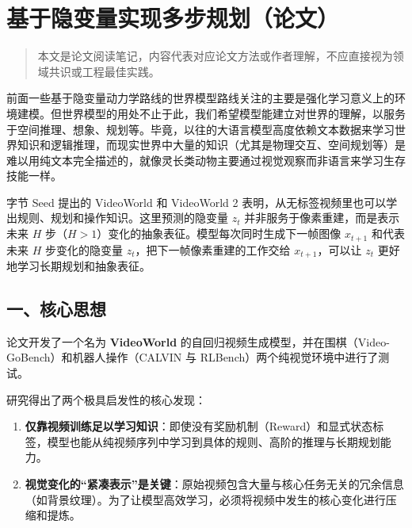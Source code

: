 \clearpage

\hypertarget{ux57faux4e8eux9690ux53d8ux91cfux5b9eux73b0ux591aux6b65ux89c4ux5212ux8bbaux6587}{%
\section{基于隐变量实现多步规划（论文）}\label{ux57faux4e8eux9690ux53d8ux91cfux5b9eux73b0ux591aux6b65ux89c4ux5212ux8bbaux6587}}

\begin{quote}
本文是论文阅读笔记，内容代表对应论文方法或作者理解，不应直接视为领域共识或工程最佳实践。
\end{quote}

前面一些基于隐变量动力学路线的世界模型路线关注的主要是强化学习意义上的环境建模。但世界模型的用处不止于此，我们希望模型能建立对世界的理解，以服务于空间推理、想象、规划等。毕竟，以往的大语言模型高度依赖文本数据来学习世界知识和逻辑推理，而现实世界中大量的知识（尤其是物理交互、空间规划等）是难以用纯文本完全描述的，就像灵长类动物主要通过视觉观察而非语言来学习生存技能一样。

字节 Seed 提出的 VideoWorld 和 VideoWorld 2 表明，从无标签视频里也可以学出规则、规划和操作知识。这里预测的隐变量 \(z_t\) 并非服务于像素重建，而是表示未来 \(H\) 步（\(H\gt 1\)）变化的抽象表征。模型每次同时生成下一帧图像 \(x_{t+1}\) 和代表未来 \(H\) 步变化的隐变量 \(z_t\)，把下一帧像素重建的工作交给 \(x_{t+1}\)，可以让 \(z_t\) 更好地学习长期规划和抽象表征。

\hypertarget{ux4e00ux6838ux5fc3ux601dux60f3-24}{%
\subsection{一、核心思想}\label{ux4e00ux6838ux5fc3ux601dux60f3-24}}

论文开发了一个名为 \textbf{VideoWorld} 的自回归视频生成模型，并在围棋（Video-GoBench）和机器人操作（CALVIN 与 RLBench）两个纯视觉环境中进行了测试。

研究得出了两个极具启发性的核心发现：

\begin{enumerate}
\def\labelenumi{\arabic{enumi}.}
\tightlist
\item
  \textbf{仅靠视频训练足以学习知识}：即使没有奖励机制（Reward）和显式状态标签，模型也能从纯视频序列中学习到具体的规则、高阶的推理与长期规划能力。
\item
  \textbf{视觉变化的``紧凑表示''是关键}：原始视频包含大量与核心任务无关的冗余信息（如背景纹理）。为了让模型高效学习，必须将视频中发生的核心变化进行压缩和提炼。
\end{enumerate}

